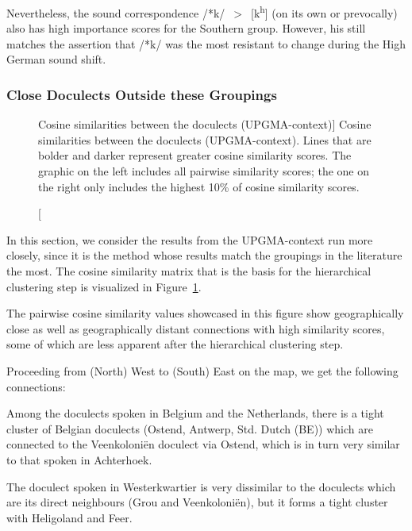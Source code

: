 \documentclass[a4paper]{article}
\begin{document}
Nevertheless, the sound correspondence /*k/~$>$~[k\textsuperscript{h}]
(on its own or prevocally) also has high importance scores
for the Southern group.
However, his still matches the assertion that /*k/
was the most resistant to change during the High German sound shift.

\subsubsection{Close Doculects Outside these Groupings}
\label{subsubsec:cosine}

\begin{figure}[h]
\begin{adjustwidth}{-3cm}{-3cm}
\centering

\hspace{-7em}

\end{adjustwidth}
\caption
[Cosine similarities between the doculects (UPGMA-context)]
{
Cosine similarities between the doculects (UPGMA-context).
Lines that are bolder and darker represent greater cosine similarity scores.
The graphic on the left includes all pairwise similarity scores;
the one on the right only includes the highest 10\% of cosine similarity scores.
}
\label{fig:cosine}
\end{figure}

In this section, we consider the results from
the UPGMA-context run more closely,
since it is the method whose results match the
groupings in the literature the most.
The cosine similarity matrix that is the basis for the
hierarchical clustering step is visualized in Figure~\ref{fig:cosine}.

The pairwise cosine similarity values showcased in this figure
show geographically close as well as geographically distant connections
with high similarity scores,
some of which are less apparent after the hierarchical clustering step.

Proceeding from (North) West to (South) East on the map,
we get the following connections:

Among the doculects spoken in Belgium and the Netherlands,
there is a tight cluster of Belgian doculects (Ostend, Antwerp, Std. Dutch (BE))
which are connected to the Veenkoloni\"{e}n doculect via Ostend,
which is in turn very similar to that spoken in Achterhoek.

The doculect spoken in Westerkwartier is very dissimilar to
the doculects which are its direct neighbours (Grou and Veenkoloni\"{e}n),
but it forms a tight cluster with Heligoland and Feer.
\end{document}
